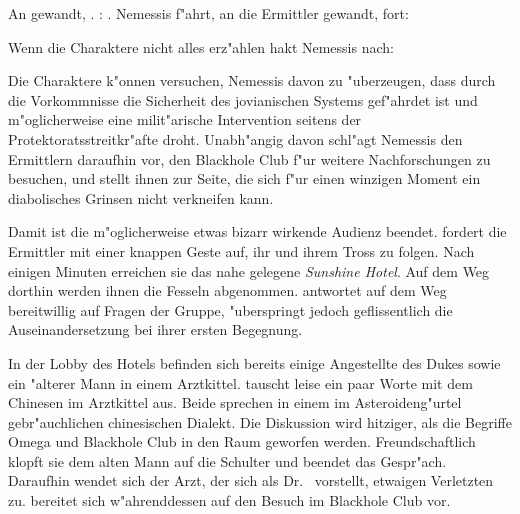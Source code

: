 
An \xl{} gewandt, . \xl{}: . Nemessis f"ahrt, an die Ermittler gewandt, fort:


Wenn die Charaktere nicht alles erz"ahlen hakt Nemessis nach:


Die Charaktere k"onnen versuchen, Nemessis davon zu "uberzeugen, dass durch die Vorkommnisse die Sicherheit des jovianischen Systems gef"ahrdet ist und m"oglicherweise eine milit"arische Intervention seitens der Protektoratsstreitkr"afte droht. Unabh"angig davon schl"agt Nemessis den Ermittlern daraufhin vor, den Blackhole Club f"ur weitere Nachforschungen zu besuchen, und stellt ihnen \xl{} zur Seite, die sich f"ur einen winzigen Moment ein diabolisches Grinsen nicht verkneifen kann.


Damit ist die m"oglicherweise etwas bizarr wirkende Audienz beendet. \xl{} fordert die Ermittler mit einer knappen Geste auf, ihr und ihrem Tross zu folgen. Nach einigen Minuten erreichen sie das nahe gelegene  \emph{Sunshine Hotel}. Auf dem Weg dorthin werden ihnen die Fesseln abgenommen. \xl{} antwortet auf dem Weg bereitwillig auf Fragen der Gruppe, "uberspringt jedoch geflissentlich die Auseinandersetzung bei ihrer ersten Begegnung.

In der Lobby des Hotels befinden sich bereits einige Angestellte des Dukes sowie ein "alterer Mann in einem Arztkittel. \xl{} tauscht leise ein paar Worte mit dem Chinesen im Arztkittel aus. Beide sprechen in einem im Asteroideng"urtel gebr"auchlichen chinesischen Dialekt. Die Diskussion wird hitziger, als die Begriffe Omega und Blackhole Club in den Raum geworfen werden. Freundschaftlich klopft sie dem alten Mann auf die Schulter und beendet das Gespr"ach. Daraufhin wendet sich der Arzt, der sich als Dr.~  vorstellt, etwaigen Verletzten zu. \xl{} bereitet sich w"ahrenddessen auf den Besuch im Blackhole Club vor.

